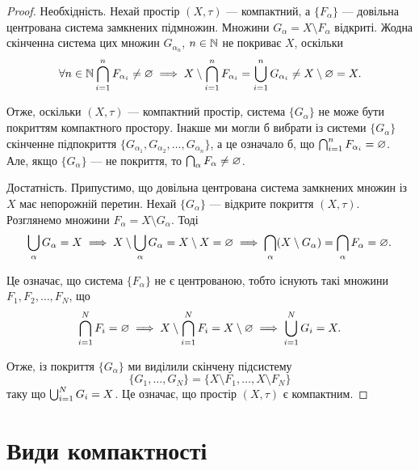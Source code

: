 \begin{proof}
Необхідність. Нехай простір $(X, \tau)$ ---
компактний, а $\{F_\alpha\}$ --- довільна центрована система
замкнених підмножин. Множини $G_\alpha = X \setminus F_\alpha$ відкриті.
Жодна скінченна система цих множин $G_{\alpha_n}$, $n \in \mathbb{N}$ не
покриває $X$, оскільки
\begin{equation*}
\forall n \in \mathbb{N} \operatorname*{\bigcap}_{i = 1}^n F_{\alpha_i} \ne \varnothing \implies
X \setminus \operatorname*{\bigcap}_{i = 1}^n F_{\alpha_i} =
\operatorname*{\bigcup}_{i = 1}^n G_{\alpha_i} \ne X \setminus \varnothing = X.
\end{equation*}

Отже, оскільки $(X, \tau)$ --- компактний простір, система
$\{G_\alpha\}$ не може бути покриттям компактного простору.
Інакше ми могли б вибрати із системи $\{G_\alpha\}$ скінченне
підпокриття $\{G_{\alpha_1}, G_{\alpha_2}, \dots, G_{\alpha_n}\}$,
а це означало б, що $\operatorname*{\bigcap}_{i = 1}^n F_{\alpha_i} = \varnothing$.
Але, якщо $\{G_\alpha\}$ --- не покриття, то $\operatorname*{\bigcap}_\alpha F_\alpha \ne \varnothing$.

Достатність. Припустимо, що довільна центрована
система замкнених множин із $X$ має непорожній перетин.
Нехай $\{G_\alpha\}$ --- відкрите покриття $(X, \tau)$. Розглянемо
множини $F_\alpha = X \setminus G_\alpha$. Тоді
\begin{equation*}
\operatorname*{\bigcup}_\alpha G_\alpha = X \implies
X \setminus \operatorname*{\bigcup}_\alpha G_\alpha = X \setminus X = \varnothing \implies
\operatorname*{\bigcap}_\alpha (X \setminus G_\alpha) =
\operatorname*{\bigcap}_\alpha F_\alpha = \varnothing.
\end{equation*}

Це означає, що система $\{F_\alpha\}$ не є центрованою, тобто
існують такі множини $F_1, F_2, \dots, F_N$, що
\begin{equation*}
\operatorname*{\bigcap}_{i = 1}^N F_i = \varnothing \implies
X \setminus \operatorname*{\bigcap}_{i = 1}^N F_i = X \setminus \varnothing \implies
\operatorname*{\bigcup}_{i = 1}^N G_i = X.
\end{equation*}

Отже, із покриття $\{G_\alpha\}$ ми виділили скінчену підсистему
\begin{equation*}
\{G_1, \dots, G_N\} = \{X \setminus F_1, \dots, X \setminus F_N\}
\end{equation*}
таку що $\operatorname*{\bigcup}_{i = 1}^N G_i = X$. Це означає, що простір $(X, \tau)$ є
компактним.
\end{proof}

\section{Види компактності}

